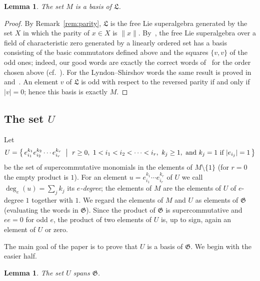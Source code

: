 \documentclass[11pt,reqno]{amsart}
\newcommand{\G}{\mathfrak G}
\newcommand{\LL}{\mathfrak L}
\newcommand{\rp}[1]{\|#1\|}
\theoremstyle{plain}
\newtheorem{lemma}[theorem]{Lemma}
\theoremstyle{definition}
\theoremstyle{remark}
\begin{document}
\begin{lemma}\label{lem:M}
The set $M$ is a basis of $\LL$.
\end{lemma}

\begin{proof}
By Remark~\ref{rem:parity}, $\LL$ is the free Lie superalgebra generated by the set $X$ in which the parity of $x\in X$ is $\rp x$.
By~\cite[Theorem~1]{S86}, the free Lie superalgebra over a field of characteristic zero generated by a linearly ordered set has a basis consisting of the basic commutators defined above and the squares $\{v,v\}$ of the odd ones; indeed, our good words are exactly the correct words of~\cite{S86} for the order chosen above (cf.~\cite[Section~3]{K17}). For the Lyndon--Shirshov words the same result is proved in~\cite[Chapter~2]{BMPZ} and~\cite{BKLM}.
An element $v$ of $\LL$ is odd with respect to the reversed parity if and only if $|v|=0$; hence this basis is exactly $M$.
\end{proof}

\subsection*{The set \texorpdfstring{$U$}{U}}
Let
$$
U=\bigl\{\,e_{i_1}^{k_1}e_{i_2}^{k_2}\cdots e_{i_r}^{k_r}\ \bigm|\ r\ge0,\ 1<i_1<i_2<\dots<i_r,\ k_j\ge1,\ \text{and } k_j=1 \text{ if } |e_{i_j}|=1\,\bigr\}
$$
be the set of supercommutative monomials in the elements of $M\setminus\{1\}$ (for $r=0$ the empty product is $1$).
For an element $u=e_{i_1}^{k_1}\cdots e_{i_r}^{k_r}$ of $U$ we call $\deg_e(u)=\sum_j k_j$ its \emph{$e$-degree}; the elements of $M$ are the elements of $U$ of $e$-degree $1$ together with $1$.
We regard the elements of $M$ and $U$ as elements of $\G$ (evaluating the words in $\G$).
Since the product of $\G$ is supercommutative and $ee=0$ for odd $e$, the product of two elements of $U$ is, up to sign, again an element of $U$ or zero.

The main goal of the paper is to prove that $U$ is a basis of $\G$.
We begin with the easier half.

\begin{lemma}\label{vsp}
The set $U$ spans $\G$.
\end{lemma}
\end{document}
